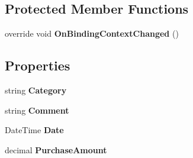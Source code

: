 \subsection*{Protected Member Functions}
\begin{DoxyCompactItemize}
\item 
\mbox{\label{class_pocket_saver_1_1_views_1_1_transaction_1_1_transaction_list_cell_a90e43ae65385f8f8e36d075798463d12}} 
override void {\bfseries On\+Binding\+Context\+Changed} ()
\end{DoxyCompactItemize}
\subsection*{Properties}
\begin{DoxyCompactItemize}
\item 
\mbox{\label{class_pocket_saver_1_1_views_1_1_transaction_1_1_transaction_list_cell_a5cd6915c7c80aa41c2c7ad0b8f931c92}} 
string {\bfseries Category}
\item 
\mbox{\label{class_pocket_saver_1_1_views_1_1_transaction_1_1_transaction_list_cell_aa5cd06e831b18763e1dc0c56f61c6298}} 
string {\bfseries Comment}
\item 
\mbox{\label{class_pocket_saver_1_1_views_1_1_transaction_1_1_transaction_list_cell_acceed74c5cc44e2e8caad5a5e8053efe}} 
Date\+Time {\bfseries Date}
\item 
\mbox{\label{class_pocket_saver_1_1_views_1_1_transaction_1_1_transaction_list_cell_a758e9ee37c5208cacbd73a68433b8c58}} 
decimal {\bfseries Purchase\+Amount}
\end{DoxyCompactItemize}



